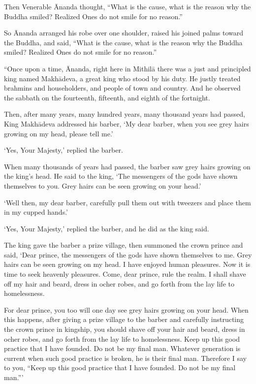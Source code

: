 \documentclass[12pt,openany]{book}%
\begin{document}
Then Venerable Ānanda thought, “What is the cause, what is the reason why the Buddha smiled? Realized Ones do not smile for no reason.” 

So Ānanda arranged his robe over one shoulder, raised his joined palms toward the Buddha, and said, “What is the cause, what is the reason why the Buddha smiled? Realized Ones do not smile for no reason.” 

“Once upon a time, Ānanda, right here in \textsanskrit{Mithilā} there was a just and principled king named \textsanskrit{Makhādeva}, a great king who stood by his duty. He justly treated brahmins and householders, and people of town and country. And he observed the sabbath on the fourteenth, fifteenth, and eighth of the fortnight. 

Then, after many years, many hundred years, many thousand years had passed, King \textsanskrit{Makhādeva} addressed his barber, ‘My dear barber, when you see grey hairs growing on my head, please tell me.’ 

‘Yes, Your Majesty,’ replied the barber. 

When many thousands of years had passed, the barber saw grey hairs growing on the king’s head. He said to the king, ‘The messengers of the gods have shown themselves to you. Grey hairs can be seen growing on your head.’ 

‘Well then, my dear barber, carefully pull them out with tweezers and place them in my cupped hands.’ 

‘Yes, Your Majesty,’ replied the barber, and he did as the king said. 

The king gave the barber a prize village, then summoned the crown prince and said, ‘Dear prince, the messengers of the gods have shown themselves to me. Grey hairs can be seen growing on my head. I have enjoyed human pleasures. Now it is time to seek heavenly pleasures. Come, dear prince, rule the realm. I shall shave off my hair and beard, dress in ocher robes, and go forth from the lay life to homelessness. 

For dear prince, you too will one day see grey hairs growing on your head. When this happens, after giving a prize village to the barber and carefully instructing the crown prince in kingship, you should shave off your hair and beard, dress in ocher robes, and go forth from the lay life to homelessness. Keep up this good practice that I have founded. Do not be my final man. Whatever generation is current when such good practice is broken, he is their final man. Therefore I say to you, “Keep up this good practice that I have founded. Do not be my final man.”’ 
\end{document}
